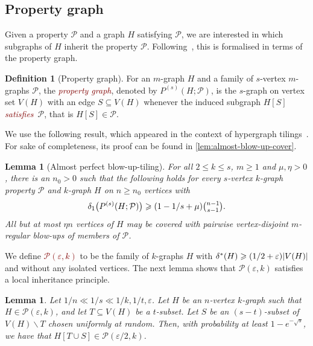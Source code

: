 \documentclass[12pt,reqno]{amsart}
\theoremstyle{plain}
\newtheorem{lemma}[theorem]{Lemma}
\theoremstyle{definition}
\newtheorem{definition}[theorem]{Definition}
\numberwithin{equation}{section}
\DeclarePairedDelimiter{\abs}{\lvert}{\rvert}
\renewcommand{\geq}{\geqslant}
\renewcommand{\leq}{\leqslant}
\renewcommand{\setminus}{\smallsetminus}
\renewcommand{\subset}{\subseteq}
\newcommand{\defn}[1]{\textcolor{Maroon}{\emph{#1}}}
\newcommand{\eps}{\varepsilon}
\newcommand{\comin}{\delta^{\ast}}
\newcommand{\PG}[3]{{P^{(#3)}}(#1;#2)}
\newcommand{\cP}{\mathcal{P}}
\begin{document}
	\subsection{Property graph} \label{sec:property_graph}
	
	Given a property $\cP$ and a graph $H$ satisfying $\cP$, we are interested in which subgraphs of $H$ inherit the property $\cP$. Following~\cite{lang2023tiling}, this is formalised in terms of the property graph.
	
	\begin{definition}[Property graph] \label{def:property-graph}
		For an $m$-graph $H$ and a family of $s$-vertex $m$-graphs $\cP$, the \defn{property graph}, denoted by $\PG{H}{\cP}{s}$, is the $s$-graph on vertex set $V(H)$ with an edge $S \subset V(H)$ whenever the induced subgraph $H[S]$ \defn{satisfies}~$\cP$, that is $H[S] \in \cP$.
	\end{definition}
	
	We use the following result, which appeared in the context of hypergraph tilings~\cite[Lemma~4.4]{lang2023tiling}.
	For sake of completeness, its proof can be found in \cref{lem:almost-blow-up-cover}.
	
	\begin{lemma}[Almost perfect blow-up-tiling] \label{lem:covering-with-blow-ups}
		For all $2\leq k \leq s$, $m\geq 1$ and $\mu,\eta >0$, there is an $n_0>0$ such that the following holds for every $s$-vertex $k$-graph property $\cP$ and $k$-graph $H$ on $n \geq n_0$ vertices  with
		\begin{equation*}
			\delta_1 \bigl(\PG{H}{ \cP }{s}\bigr) \geq   (1 - 1/s + \mu) \tbinom{n-1}{s-1}.
		\end{equation*}
		All but at most $\eta n$ vertices of $H$ may be covered with pairwise vertex-disjoint $m$-regular blow-ups of members of $\cP$.
	\end{lemma}
	
	We define \defn{$\cP(\eps, k)$} to be the family of $k$-graphs $H$ with $\comin(H) \geq (1/2 + \eps)\abs{V(H)}$ and without any isolated vertices.
	The next lemma shows that $\cP(\eps,k)$ satisfies a local inheritance principle.
	
	\begin{lemma}\label{lem:robustmoregeneral}
		Let $1/n\ll 1/s \ll 1/k, 1/t, \eps$. Let $H$ be an $n$-vertex $k$-graph such that $H\in \cP(\eps,k)$, and let $T\subseteq V(H)$ be a $t$-subset. Let $S$ be an $(s-t)$-subset of $V(H) \setminus T$ chosen uniformly at random.
		Then, with probability at least $1-e^{-\sqrt{s}}$, we have that $H[T\cup S]\in \cP(\eps/2,k)$.
	\end{lemma}
	
\end{document}
